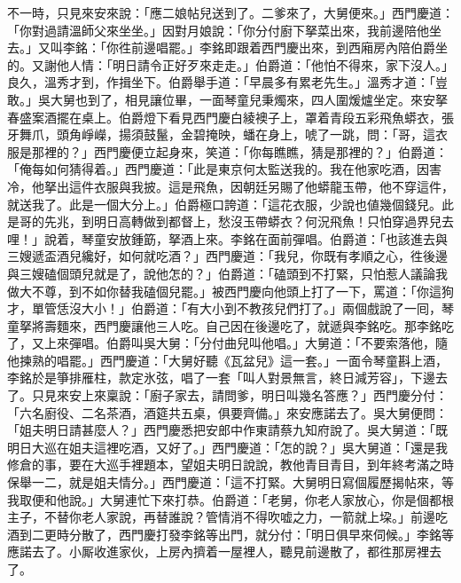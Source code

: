 不一時，只見來安來說：「應二娘帖兒送到了。二爹來了，大舅便來。」西門慶道：「你對過請溫師父來坐坐。」因對月娘說：「你分付廚下拏菜出來，我前邊陪他坐去。」又叫李銘：「你徃前邊唱罷。」李銘即跟着西門慶出來，到西廂房內陪伯爵坐的。又謝他人情：「明日請令正好歹來走走。」伯爵道：「他怕不得來，家下沒人。」良久，溫秀才到，作揖坐下。伯爵舉手道：「早晨多有累老先生。」溫秀才道：「豈敢。」吳大舅也到了，相見讓位畢，一面琴童兒秉燭來，四人圍煖爐坐定。來安拏春盛案酒擺在桌上。伯爵燈下看見西門慶白綾襖子上，罩着青段五彩飛魚蟒衣，張牙舞爪，頭角崢嶸，揚須鼓鬣，金碧掩映，蟠在身上，唬了一跳，問：「哥，這衣服是那裡的？」西門慶便立起身來，笑道：「你每瞧瞧，猜是那裡的？」伯爵道：「俺每如何猜得着。」西門慶道：「此是東京何太監送我的。{}我在他家吃酒，因害冷，他拏出這件衣服與我披。這是飛魚，因朝廷另賜了他蟒龍玉帶，他不穿這件，就送我了。此是一個大分上。」伯爵極口誇道：「這花衣服，少說也値幾個錢兒。此是哥的先兆，到明日高轉做到都督上，愁沒玉帶蟒衣？何況飛魚！只怕穿過界兒去哩！」{}說着，琴童安放鍾筯，拏酒上來。李銘在面前彈唱。伯爵道：「也該進去與三嫂遞盃酒兒纔好，如何就吃酒？」西門慶道：「我兒，你既有孝順之心，徃後邊與三嫂磕個頭兒就是了，說他怎的？」伯爵道：「磕頭到不打緊，只怕惹人議論我做大不尊，到不如你替我磕個兒罷。」被西門慶向他頭上打了一下，罵道：「你這狗才，單管恁沒大小！」伯爵道：「有大小到不教孩兒們打了。」兩個戲說了一囘，琴童拏將壽麵來，西門慶讓他三人吃。自己因在後邊吃了，就遞與李銘吃。那李銘吃了，又上來彈唱。伯爵叫吳大舅：「分付曲兒叫他唱。」大舅道：「不要索落他，隨他揀熟的唱罷。」西門慶道：「大舅好聽《瓦盆兒》這一套。」一面令琴童斟上酒，李銘於是箏排雁柱，款定氷弦，唱了一套「叫人對景無言，終日減芳容」，下邊去了。只見來安上來稟說：「廚子家去，請問爹，明日叫幾名答應？」西門慶分付：「六名廚役、二名茶酒，酒筵共五桌，俱要齊備。」來安應諾去了。吳大舅便問：「姐夫明日請甚麼人？」西門慶悉把安郎中作東請蔡九知府說了。吳大舅道：「既明日大巡在姐夫這裡吃酒，又好了。」西門慶道：「怎的說？」吳大舅道：「還是我修倉的事，要在大巡手裡題本，望姐夫明日說說，教他青目青目，到年終考滿之時保舉一二，就是姐夫情分。」西門慶道：「這不打緊。大舅明日寫個履歷揭帖來，等我取便和他說。」大舅連忙下來打恭。伯爵道：「老舅，你老人家放心，你是個都根主子，不替你老人家說，再替誰說？管情消不得吹嘘之力，一箭就上垜。」{}前邊吃酒到二更時分散了，西門慶打發李銘等出門，就分付：「明日俱早來伺候。」李銘等應諾去了。小厮收進家伙，上房內擠着一屋裡人，聽見前邊散了，都徃那房裡去了。

